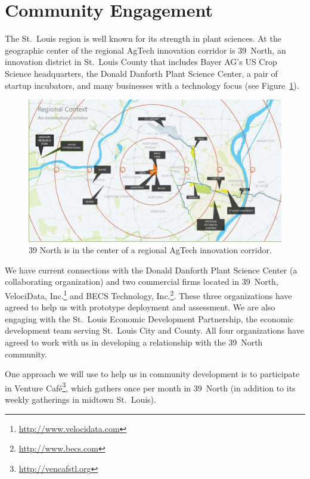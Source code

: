 \section{Community Engagement}
\label{sec:community}

The St.~Louis region is well known for its strength in plant sciences.
At the geographic center of the regional AgTech innovation corridor is
39~North, an innovation district in St.~Louis County that includes Bayer AG's
US Crop Science headquarters, the Donald Danforth Plant Science Center,
a pair of startup incubators, and many businesses with a technology focus
(see Figure~\ref{fig:39N}).

\begin{figure}[ht]
\centering
\includegraphics[width=0.75\linewidth]{figures/39N}
\caption{39 North is in the center of a regional AgTech innovation corridor.}
\label{fig:39N}
\end{figure}

We have current connections with the Donald Danforth Plant Science
Center (a collaborating organization) and two commercial firms
located in 39~North,
VelociData, Inc.\footnote{\url{http://www.velocidata.com}} and
BECS Technology, Inc.\footnote{\url{http://www.becs.com}}.
These three organizations have agreed to help us with prototype deployment
and assessment.
We are also engaging with the St.~Louis Economic Development Partnership,
the economic development team serving St.~Louis City and County.
All four organizations have agreed to work with us in
developing a relationship with the 39~North community.

One approach we will use to help us in community development is to participate
in Venture Caf\'e\footnote{\url{http://vencafstl.org}}, which gathers once per
month in 39~North (in addition to its weekly gatherings in midtown St.~Louis).
